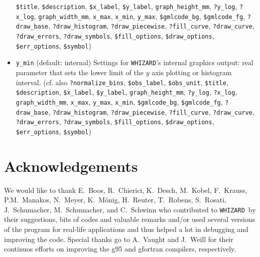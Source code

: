\documentclass[12pt]{book}
\newcommand{\ttt}[1]{\texttt{#1}}
\newcommand{\whizard}{\texttt{WHIZARD}}
\begin{document}
\begin{itemize}
\ttt{\$title}, \ttt{\$description}, \ttt{\$x\_label},
\ttt{\$y\_label}, \ttt{graph\_height\_mm}, \ttt{?y\_log},
\newline \ttt{?x\_log}, \ttt{graph\_width\_mm}, \ttt{x\_max},
\ttt{x\_min}, \ttt{y\_max}, \ttt{\$gmlcode\_bg}, \ttt{\$gmlcode\_fg},
\ttt{?draw\_base}, \newline \ttt{?draw\_histogram}, \ttt{?draw\_piecewise},
\ttt{?fill\_curve}, \ttt{?draw\_curve}, \ttt{?draw\_errors},
\newline \ttt{?draw\_symbols}, \ttt{\$fill\_options}, \ttt{\$draw\_options},
\ttt{\$err\_options}, \ttt{\$symbol})
\item
\ttt{y\_min} \qquad (default: internal) \newline
Settings for \whizard's internal graphics output: real parameter that
sets the lower limit of the $y$ axis plotting or histogram interval. (cf. also
\ttt{?normalize\_bins}, \ttt{\$obs\_label}, \ttt{\$obs\_unit},
\ttt{\$title}, \ttt{\$description}, \ttt{\$x\_label},
\ttt{\$y\_label}, \ttt{graph\_height\_mm}, \ttt{?y\_log},
\newline \ttt{?x\_log}, \ttt{graph\_width\_mm}, \ttt{x\_max},
\ttt{y\_max}, \ttt{x\_min}, \ttt{\$gmlcode\_bg}, \ttt{\$gmlcode\_fg},
\ttt{?draw\_base}, \newline \ttt{?draw\_histogram}, \ttt{?draw\_piecewise},
\ttt{?fill\_curve}, \ttt{?draw\_curve}, \ttt{?draw\_errors},
\newline \ttt{?draw\_symbols}, \ttt{\$fill\_options}, \ttt{\$draw\_options},
\ttt{\$err\_options}, \ttt{\$symbol})
\end{itemize}

\clearpage
\section*{Acknowledgements}

We would like to thank E.~Boos, R.~Chierici, K.~Desch, M.~Kobel,
F.~Krauss, P.M.~Manakos, N.~Meyer, K.~M\"onig, H.~Reuter, T.~Robens,
S.~Rosati, J.~Schumacher, M.~Schumacher, and C.~Schwinn who
contributed to \whizard\ by their suggestions, bits of codes and
valuable remarks and/or used several versions of the program for
real-life applications and thus helped a lot in debugging and
improving the code.  Special thanks go to A.~Vaught and J.~Weill for
their continuos efforts on improving the g95 and gfortran compilers,
respectively. 
\end{document}
